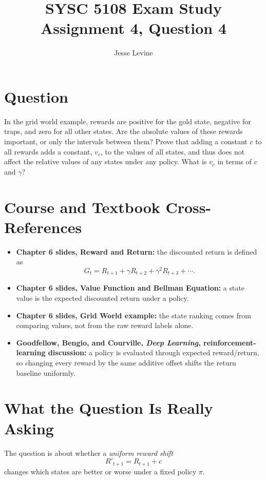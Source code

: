 \documentclass[11pt]{article}
\title{SYSC 5108 Exam Study\\Assignment 4, Question 4}
\author{Jesse Levine}
\date{}
\begin{document}
\maketitle

\section*{Question}

In the grid world example, rewards are positive for the gold state, negative for
traps, and zero for all other states. Are the absolute values of these rewards
important, or only the intervals between them? Prove that adding a constant
\(c\) to all rewards adds a constant, \(v_c\), to the values of all states, and
thus does not affect the relative values of any states under any policy. What is
\(v_c\) in terms of \(c\) and \(\gamma\)?

\section*{Course and Textbook Cross-References}

\begin{itemize}
    \item \textbf{Chapter 6 slides, Reward and Return:} the discounted return is
    defined as
    \[
        G_t = R_{t+1} + \gamma R_{t+2} + \gamma^2 R_{t+3} + \cdots.
    \]
    \item \textbf{Chapter 6 slides, Value Function and Bellman Equation:} a
    state value is the expected discounted return under a policy.
    \item \textbf{Chapter 6 slides, Grid World example:} the state ranking comes
    from comparing values, not from the raw reward labels alone.
    \item \textbf{Goodfellow, Bengio, and Courville, \emph{Deep Learning},
    reinforcement-learning discussion:} a policy is evaluated through expected
    reward/return, so changing every reward by the same additive offset shifts the
    return baseline uniformly.
\end{itemize}

\section*{What the Question Is Really Asking}

The question is about whether a \emph{uniform reward shift}
\[
    R'_{t+1} = R_{t+1} + c
\]
changes which states are better or worse under a fixed policy \(\pi\).
\end{document}
